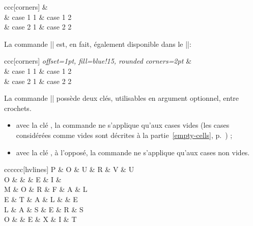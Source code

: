 \documentclass[dvipsnames]{article}
\begin{document}
\bigskip
\begin{Code}[width=9cm,show-output]
\renewcommand{\arraystretch}{1.3}
\begin{NiceTabular}{ccc}[corners]
  &  \\
  & case 1 1 & case 1 2 \\
  & case 2 1 & case 2 2
\CodeAfter
  \emph{}
\end{NiceTabular}
\end{Code}

\bigskip
La commande |\TikzEveryCell| est, en fait, également disponible dans le |\CodeBefore|:

\medskip
\begin{Code}[width=9cm,show-output]
\renewcommand{\arraystretch}{1.3}
\begin{NiceTabular}{ccc}[corners]
\CodeBefore
  \emph{\TikzEveryCell
    {
      offset=1pt,
      fill=blue!15,
      rounded corners=2pt
    }}
\Body
  &  \\
  & case 1 1 & case 1 2 \\
  & case 2 1 & case 2 2
\end{NiceTabular}
\end{Code}



\bigskip
La commande |\TikzEveryCell| possède deux clés, utilisables en argument
optionnel, entre crochets.
\begin{itemize}[beginpenalty=10000]
\item avec la clé , la commande ne s'applique qu'aux cases
vides (les cases considérées comme vides sont décrites à la
partie~\ref{empty-cells}, p.~\pageref{empty-cells}) ;
\item avec la clé , à l'opposé, la commande ne s'applique qu'aux
cases non vides.
\end{itemize}

\medskip
\begin{Code}[width=9cm,show-output]
\renewcommand{\arraystretch}{1.4}
\begin{NiceTabular}{cccccc}[hvlines]
  P & O & U & R & V & U \\
  O &   &   & E & I &   \\
  M & O & R & F & A & L \\
  E & T & A & L &   & E \\
  L & A & S & E & R & S \\
  O &   & E & X & I & T
\CodeAfter
  \emph{}
\end{NiceTabular}
\end{Code}
\end{document}
